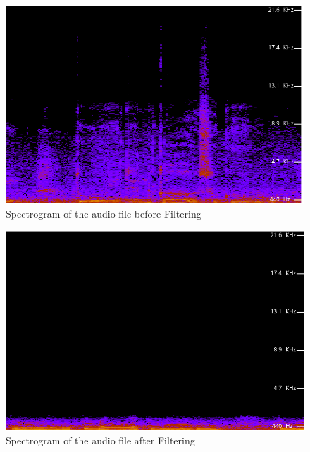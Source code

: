 \documentclass[journal,12pt,twocolumn]{IEEEtran}
\theoremstyle{remark}
\begin{document}
\begin{enumerate}[label=\thesection.\arabic*
,ref=\thesection.\theenumi]
\begin{figure}[H]
    \includegraphics[width=0.8\columnwidth]{figs/A1.png }
        \caption{Spectrogram of the audio file before Filtering}
	    \label{fig:before_filter_plot}
	    \end{figure}
	    \begin{figure}[H]
	    \includegraphics[width=0.8\columnwidth]{figs/A2.png}
	        \caption{Spectrogram of the audio file after Filtering}
		    \label{fig:after_filter_plot}
		    \end{figure}



		    \end{enumerate}
\end{document}
